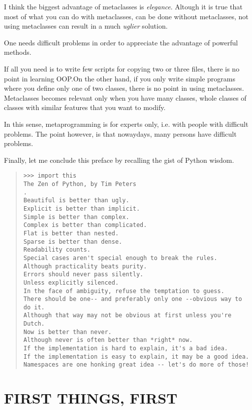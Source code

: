 \documentclass[10pt,english]{article}
\begin{document}
I think the biggest advantage of metaclasses is \emph{elegance}. Altough it
is true that most of what you can do with metaclasses, can be done without 
metaclasses, not using metaclasses can result in a much \emph{uglier} solution.

One needs difficult problems in order to appreciate the advantage
of powerful methods.

If all you need is to write few scripts for copying two or three files,
there is no point in learning OOP.On the other hand, if you only
write simple programs where you define only one of two classes, there
is no point in using metaclasses. Metaclasses becomes relevant only
when you have many classes, whole classes of classes with similar
features that you want to modify.

In this sense, metaprogramming is for experts only, i.e. with people
with difficult problems. The point however, is that nowaydays,
many persons have difficult problems.

Finally, let me conclude this preface by recalling the
gist of Python wisdom.
\begin{quote}
\begin{verbatim}>>> import this
The Zen of Python, by Tim Peters
.
Beautiful is better than ugly.
Explicit is better than implicit.
Simple is better than complex.
Complex is better than complicated.
Flat is better than nested.
Sparse is better than dense.
Readability counts.
Special cases aren't special enough to break the rules.
Although practicality beats purity.
Errors should never pass silently.
Unless explicitly silenced.
In the face of ambiguity, refuse the temptation to guess.
There should be one-- and preferably only one --obvious way to do it.
Although that way may not be obvious at first unless you're Dutch.
Now is better than never.
Although never is often better than *right* now.
If the implementation is hard to explain, it's a bad idea.
If the implementation is easy to explain, it may be a good idea.
Namespaces are one honking great idea -- let's do more of those!\end{verbatim}
\end{quote}



\hypertarget{first-things-first}{}
\section*{FIRST THINGS, FIRST}
\end{document}
